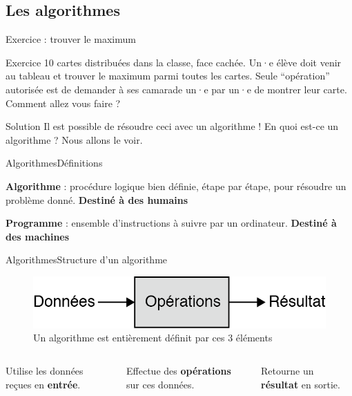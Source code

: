 \documentclass{beamer}
\begin{document}
\subsection{Les algorithmes}

\begin{frame}{Exercice : trouver le maximum}{}
	\begin{alertblock}{Exercice}
		10 cartes distribuées dans la classe, face cachée. Un·e élève doit venir au tableau et trouver le maximum parmi toutes les cartes. Seule ``opération'' autorisée est de demander à ses camarade un·e par un·e de montrer leur carte. Comment allez vous faire ?
	\end{alertblock}
	\pause
	\begin{exampleblock}{Solution}
		Il est possible de résoudre ceci avec un algorithme ! En quoi est-ce un algorithme ? Nous allons le voir.
	\end{exampleblock}
\end{frame}

\begin{frame}{Algorithmes}{Définitions}
	\begin{definition}
		\textbf{Algorithme} : procédure logique bien définie, étape par étape, pour résoudre un problème donné. \textbf{Destiné à des humains}
	\end{definition}

	\pause

	\begin{definition}
		\textbf{Programme} : ensemble d'instructions à suivre par un ordinateur. \textbf{Destiné à des machines}
	\end{definition}
\end{frame}

\begin{frame}{Algorithmes}{Structure d'un algorithme}
	\begin{figure}
		\includegraphics[width=1\linewidth]{Diagramme_algorithme.png}
		\caption{Un algorithme est entièrement définit par ces 3 éléments}
	\end{figure}

	\pause
	\begin{columns}
		\begin{column}{0.33\textwidth}
			Utilise les données re\c cues en \textbf{entrée}.
		\end{column}
		\pause
		\begin{column}{0.33\textwidth}
			Effectue des \textbf{opérations} sur ces données.
		\end{column}
		\pause
		\begin{column}{0.33\textwidth}
			Retourne un \textbf{résultat} en sortie.
		\end{column}
	\end{columns}
\end{frame}
\end{document}
